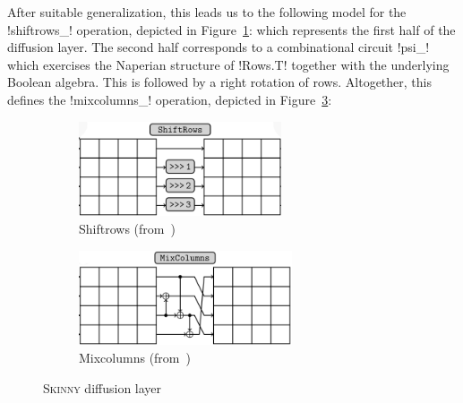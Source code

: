 \documentclass[draft,english]{jflart}
\newcommand{\ie}{\textit{i.e.}}
\newcommand{\Skinny}{\textsc{Skinny}}
\begin{document}



After suitable generalization, this leads us to the following model
for the \coqe!shiftrows_! operation, depicted in
Figure~\ref{fig:shiftrows}:
%
%
which represents the first half of the diffusion layer.
%
%
The second half corresponds to a combinational circuit \coqe!psi_!
%
%
which exercises the Naperian structure of \coqe!Rows.T! together with
the underlying Boolean algebra. This is followed by a right rotation
of rows. Altogether, this defines the \coqe!mixcolumns_! operation,
depicted in Figure~\ref{fig:mixcolumns}:
%

\begin{figure}[tp]
  \centering
  \begin{subfigure}[t]{0.45\textwidth}
    \centering
    \includegraphics[draft=false,height=2.8cm]{shiftrows}
    \caption{Shiftrows (from~\citet{beierle:skinny})}
    \label{fig:shiftrows}
  \end{subfigure}
  \begin{subfigure}[t]{0.45\textwidth}
    \centering
    \includegraphics[draft=false,height=2.8cm]{mixcolumns}
    \caption{Mixcolumns (from~\citet{beierle:skinny})}
    \label{fig:mixcolumns}
  \end{subfigure}
  \caption{\Skinny{} diffusion layer}
\end{figure}
\end{document}
